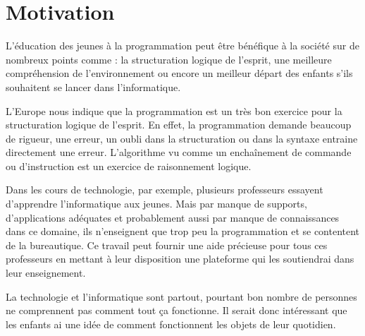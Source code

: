 \section{Motivation}
\label{intro-motivation}
L'éducation des jeunes à la programmation peut être bénéfique à la société sur de nombreux points comme : la structuration logique de l'esprit, une meilleure compréhension de l'environnement ou encore un meilleur départ des enfants s'ils souhaitent se lancer dans l'informatique.

L'Europe nous indique que la programmation est un très bon exercice pour la structuration logique de l'esprit. En effet, la programmation demande beaucoup de rigueur, une erreur, un oubli dans la structuration ou dans la syntaxe entraine directement une erreur. L'algorithme vu comme un enchaînement de commande ou d'instruction est un exercice de raisonnement logique.

Dans les cours de technologie, par exemple, plusieurs professeurs essayent d'apprendre l'informatique aux jeunes. Mais par manque de supports, d'applications adéquates et probablement aussi par manque de connaissances dans ce domaine, ils n'enseignent que trop peu la programmation et se contentent de la bureautique. Ce travail peut fournir une aide précieuse pour tous ces professeurs en mettant à leur disposition une plateforme qui les soutiendrai dans leur enseignement.

La technologie et l'informatique sont partout, pourtant bon nombre de personnes ne comprennent pas comment tout ça fonctionne. Il serait donc intéressant que les enfants ai une idée de comment fonctionnent les objets de leur quotidien.

